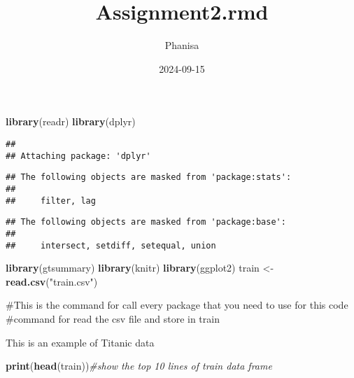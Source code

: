 \documentclass[
]{article}
\title{Assignment2.rmd}
\author{Phanisa}
\date{2024-09-15}
\newenvironment{Shaded}{\begin{snugshade}}{\end{snugshade}}
\newcommand{\CommentTok}[1]{\textcolor[rgb]{0.56,0.35,0.01}{\textit{#1}}}
\newcommand{\FunctionTok}[1]{\textcolor[rgb]{0.13,0.29,0.53}{\textbf{#1}}}
\newcommand{\NormalTok}[1]{#1}
\newcommand{\OtherTok}[1]{\textcolor[rgb]{0.56,0.35,0.01}{#1}}
\newcommand{\StringTok}[1]{\textcolor[rgb]{0.31,0.60,0.02}{#1}}
\begin{document}
\maketitle

\begin{Shaded}
\begin{Highlighting}[]
\FunctionTok{library}\NormalTok{(readr)}
\FunctionTok{library}\NormalTok{(dplyr)}
\end{Highlighting}
\end{Shaded}

\begin{verbatim}
## 
## Attaching package: 'dplyr'
\end{verbatim}

\begin{verbatim}
## The following objects are masked from 'package:stats':
## 
##     filter, lag
\end{verbatim}

\begin{verbatim}
## The following objects are masked from 'package:base':
## 
##     intersect, setdiff, setequal, union
\end{verbatim}

\begin{Shaded}
\begin{Highlighting}[]
\FunctionTok{library}\NormalTok{(gtsummary)}
\FunctionTok{library}\NormalTok{(knitr)}
\FunctionTok{library}\NormalTok{(ggplot2)}
\NormalTok{train }\OtherTok{\textless{}{-}} \FunctionTok{read.csv}\NormalTok{(}\StringTok{"train.csv"}\NormalTok{)}
\end{Highlighting}
\end{Shaded}

\#This is the command for call every package that you need to use for
this code \#command for read the csv file and store in train

This is an example of Titanic data

\begin{Shaded}
\begin{Highlighting}[]
\FunctionTok{print}\NormalTok{(}\FunctionTok{head}\NormalTok{(train))}\CommentTok{\#show the top 10 lines of train data frame}
\end{Highlighting}
\end{Shaded}
\end{document}
